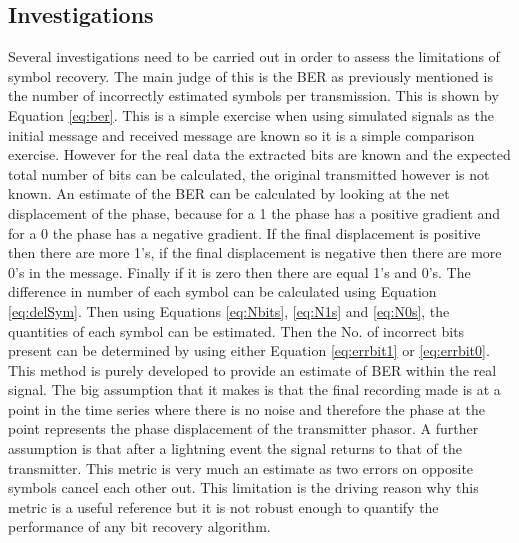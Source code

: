 \subsection{Investigations}\label{sec:investigations}
Several investigations need to be carried out in order to assess the limitations of symbol recovery. The main judge of this is the BER as previously mentioned is the number of incorrectly estimated symbols per transmission. This is shown by Equation \ref{eq:ber}. This is a simple exercise when using simulated signals as the initial message and received message are known so it is a simple comparison exercise. However for the real data the extracted bits are known and the expected total number of bits can be calculated, the original transmitted however is not known. An estimate of the BER can be calculated by looking at the net displacement of the phase, because for a 1 the phase has a positive gradient and for a 0 the phase has a negative gradient. If the final displacement is positive then there are more 1's, if the final displacement is negative then there are more 0's in the message. Finally if it is zero then there are equal 1's and 0's. The difference in number of each symbol can be calculated using Equation \ref{eq:delSym}. Then using Equations \ref{eq:Nbits}, \ref{eq:N1s} and \ref{eq:N0s}, the quantities of each symbol can be estimated. Then the No. of incorrect bits present can be determined by using either Equation \ref{eq:errbit1} or \ref{eq:errbit0}. This method is purely developed to provide an estimate of BER within the real signal. The big assumption that it makes is that the final recording made is at a point in the time series where there is no noise and therefore the phase at the point represents the phase displacement of the transmitter phasor. A further assumption is that after a lightning event the signal returns to that of the transmitter. This metric is very much an estimate as two errors on opposite symbols cancel each other out. This limitation is the driving reason why this metric is a useful reference but it is not robust enough to quantify the performance of any bit recovery algorithm. 


